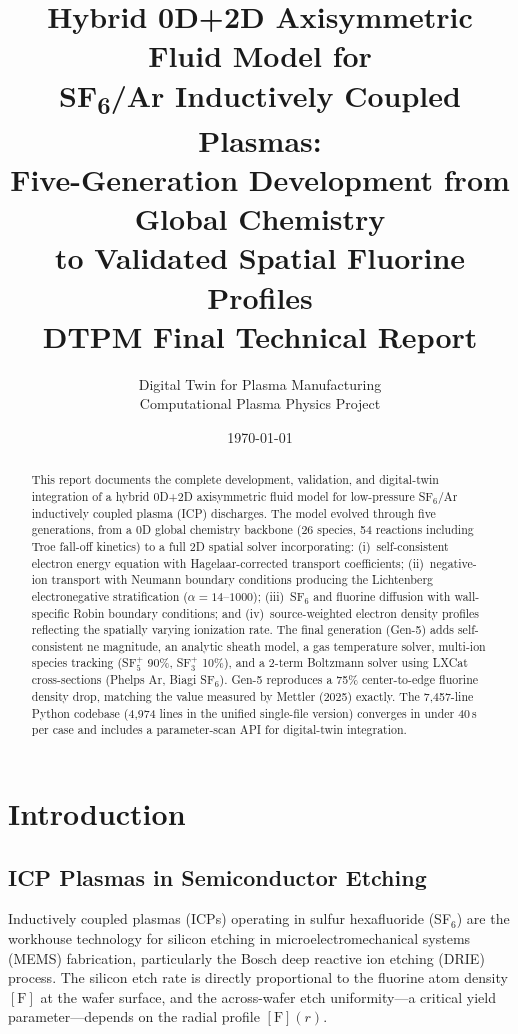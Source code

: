 \documentclass[11pt,a4paper]{article}
\title{\LARGE Hybrid 0D+2D Axisymmetric Fluid Model for\\
SF\textsubscript{6}/Ar Inductively Coupled Plasmas:\\[4pt]
\large Five-Generation Development from Global Chemistry\\
to Validated Spatial Fluorine Profiles\\[6pt]
\normalsize DTPM Final Technical Report}
\author{Digital Twin for Plasma Manufacturing\\Computational Plasma Physics Project}
\date{\today}
\begin{document}
\maketitle

\begin{abstract}
This report documents the complete development, validation, and digital-twin integration of a hybrid 0D+2D axisymmetric fluid model for low-pressure SF$_6$/Ar inductively coupled plasma (ICP) discharges.  The model evolved through five generations, from a 0D global chemistry backbone (26 species, 54 reactions including Troe fall-off kinetics) to a full 2D spatial solver incorporating: (i)~self-consistent electron energy equation with Hagelaar-corrected transport coefficients; (ii)~negative-ion transport with Neumann boundary conditions producing the Lichtenberg electronegative stratification ($\alpha = 14$--$1000$); (iii)~SF$_6$ and fluorine diffusion with wall-specific Robin boundary conditions; and (iv)~source-weighted electron density profiles reflecting the spatially varying ionization rate.  The final generation (Gen-5) adds self-consistent ne magnitude, an analytic sheath model, a gas temperature solver, multi-ion species tracking (SF$_5^+$ 90\%, SF$_3^+$ 10\%), and a 2-term Boltzmann solver using LXCat cross-sections (Phelps Ar, Biagi SF$_6$).  Gen-5 reproduces a 75\% center-to-edge fluorine density drop, matching the value measured by Mettler (2025) exactly.  The 7{,}457-line Python codebase (4{,}974 lines in the unified single-file version) converges in under 40\,s per case and includes a parameter-scan API for digital-twin integration.
\end{abstract}
\tableofcontents
\newpage

\section{Introduction}
\label{sec:intro}

\subsection{ICP Plasmas in Semiconductor Etching}

Inductively coupled plasmas (ICPs) operating in sulfur hexafluoride (SF$_6$) are the workhouse technology for silicon etching in microelectromechanical systems (MEMS) fabrication, particularly the Bosch deep reactive ion etching (DRIE) process.  The silicon etch rate is directly proportional to the fluorine atom density $[\mathrm{F}]$ at the wafer surface, and the across-wafer etch uniformity---a critical yield parameter---depends on the radial profile $[\mathrm{F}](r)$.
\end{document}
